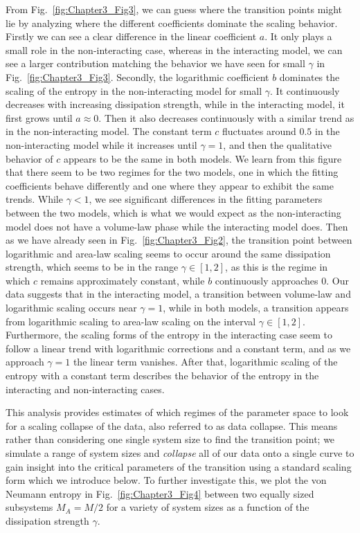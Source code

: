 From Fig.~\ref{fig:Chapter3_Fig3}, we can guess where the transition points might lie by analyzing where the different coefficients dominate the scaling behavior. Firstly we can see a clear difference in the linear coefficient $a$. It only plays a small role in the non-interacting case, whereas in the interacting model, we can see a larger contribution matching the behavior we have seen for small $\gamma$ in Fig.~\ref{fig:Chapter3_Fig3}. Secondly, the logarithmic coefficient $b$ dominates the scaling of the entropy in the non-interacting model for small $\gamma$. It continuously decreases with increasing dissipation strength, while in the interacting model, it first grows until $a \approx 0$. Then it also decreases continuously with a similar trend as in the non-interacting model. The constant term $c$ fluctuates around $0.5$ in the non-interacting model while it increases until $\gamma = 1$, and then the qualitative behavior of $c$ appears to be the same in both models. We learn from this figure that there seem to be two regimes for the two models, one in which the fitting coefficients behave differently and one where they appear to exhibit the same trends. While $\gamma<1$, we see significant differences in the fitting parameters between the two models, which is what we would expect as the non-interacting model does not have a volume-law phase while the interacting model does. Then as we have already seen in Fig.~\ref{fig:Chapter3_Fig2}, the transition point between logarithmic and area-law scaling seems to occur around the same dissipation strength, which seems to be in the range $\gamma \in [1,2]$, as this is the regime in which $c$ remains approximately constant, while $b$ continuously approaches $0$. Our data suggests that in the interacting model, a transition between volume-law and logarithmic scaling occurs near $\gamma = 1$, while in both models, a transition appears from logarithmic scaling to area-law scaling on the interval $\gamma \in [1,2]$. Furthermore, the scaling forms of the entropy in the interacting case seem to follow a linear trend with logarithmic corrections and a constant term, and as we approach $\gamma = 1$ the linear term vanishes. After that, logarithmic scaling of the entropy with a constant term describes the behavior of the entropy in the interacting and non-interacting cases.

This analysis provides estimates of which regimes of the parameter space to look for a scaling collapse of the data, also referred to as data collapse. This means rather than considering one single system size to find the transition point; we simulate a range of system sizes and \textit{collapse} all of our data onto a single curve to gain insight into the critical parameters of the transition using a standard scaling form which we introduce below. To further investigate this, we plot the von Neumann entropy in Fig.~\ref{fig:Chapter3_Fig4} between two equally sized subsystems $M_A = M/2$ for a variety of system sizes as a function of the dissipation strength $\gamma$.

